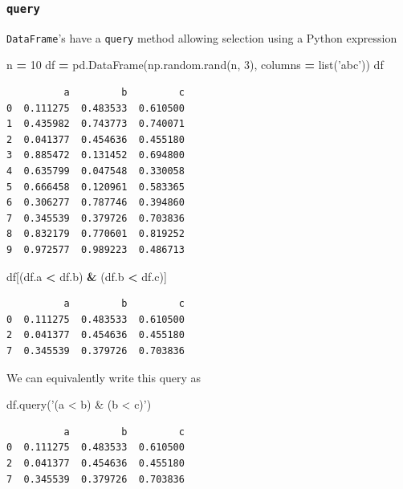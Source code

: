 \documentclass[
  letterpaper,
]{scrbook}
\newenvironment{Shaded}{\begin{snugshade}}{\end{snugshade}}
\newcommand{\BuiltInTok}[1]{#1}
\newcommand{\DecValTok}[1]{\textcolor[rgb]{0.00,0.00,0.81}{#1}}
\newcommand{\NormalTok}[1]{#1}
\newcommand{\OperatorTok}[1]{\textcolor[rgb]{0.81,0.36,0.00}{\textbf{#1}}}
\newcommand{\StringTok}[1]{\textcolor[rgb]{0.31,0.60,0.02}{#1}}
\begin{document}
\hypertarget{query}{%
\subsubsection{\texorpdfstring{\texttt{query}}{query}}\label{query}}

\texttt{DataFrame}'s have a \texttt{query} method allowing selection using a Python expression

\begin{Shaded}
\begin{Highlighting}[]
\NormalTok{n }\OperatorTok{=} \DecValTok{10}
\NormalTok{df }\OperatorTok{=}\NormalTok{ pd.DataFrame(np.random.rand(n, }\DecValTok{3}\NormalTok{), columns }\OperatorTok{=} \BuiltInTok{list}\NormalTok{(}\StringTok{'abc'}\NormalTok{))}
\NormalTok{df}
\end{Highlighting}
\end{Shaded}

\begin{verbatim}
          a         b         c
0  0.111275  0.483533  0.610500
1  0.435982  0.743773  0.740071
2  0.041377  0.454636  0.455180
3  0.885472  0.131452  0.694800
4  0.635799  0.047548  0.330058
5  0.666458  0.120961  0.583365
6  0.306277  0.787746  0.394860
7  0.345539  0.379726  0.703836
8  0.832179  0.770601  0.819252
9  0.972577  0.989223  0.486713
\end{verbatim}

\begin{Shaded}
\begin{Highlighting}[]
\NormalTok{df[(df.a }\OperatorTok{<}\NormalTok{ df.b) }\OperatorTok{&}\NormalTok{ (df.b }\OperatorTok{<}\NormalTok{ df.c)]}
\end{Highlighting}
\end{Shaded}

\begin{verbatim}
          a         b         c
0  0.111275  0.483533  0.610500
2  0.041377  0.454636  0.455180
7  0.345539  0.379726  0.703836
\end{verbatim}

We can equivalently write this query as

\begin{Shaded}
\begin{Highlighting}[]
\NormalTok{df.query(}\StringTok{'(a < b) & (b < c)'}\NormalTok{)}
\end{Highlighting}
\end{Shaded}

\begin{verbatim}
          a         b         c
0  0.111275  0.483533  0.610500
2  0.041377  0.454636  0.455180
7  0.345539  0.379726  0.703836
\end{verbatim}
\end{document}
